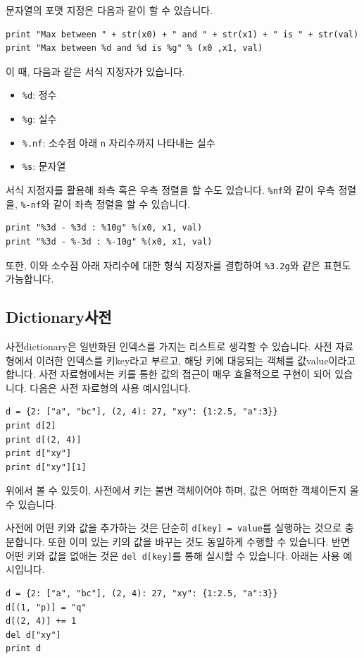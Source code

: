 \documentclass[../main.tex]{subfiles}
\begin{document}
문자열의 포맷 지정은 다음과 같이 할 수 있습니다.
\begin{verbatim}
print "Max between " + str(x0) + " and " + str(x1) + " is " + str(val)
print "Max between %d and %d is %g" % (x0 ,x1, val)
\end{verbatim}
이 때, 다음과 같은 서식 지정자가 있습니다.
\begin{itemize}
    \item \texttt{\%d}: 정수
    \item \texttt{\%g}: 실수
    \item \texttt{\%.nf}: 소수점 아래 \texttt{n} 자리수까지 나타내는 실수
    \item \texttt{\%s}: 문자열
\end{itemize}
서식 지정자를 활용해 좌측 혹은 우측 정렬을 할 수도 있습니다.
\texttt{\%nf}와 같이 우측 정렬을, \texttt{\%-nf}와 같이 좌측 정렬을 할 수 있습니다.
\begin{verbatim}
print "%3d - %3d : %10g" %(x0, x1, val)
print "%3d - %-3d : %-10g" %(x0, x1, val)
\end{verbatim}
또한, 이와 소수점 아래 자리수에 대한 형식 지정자를 결합하여 \texttt{\%3.2g}와 같은 표현도 가능합니다.

\subsection{Dictionary사전}
사전dictionary은 일반화된 인덱스를 가지는 리스트로 생각할 수 있습니다.
사전 자료형에서 이러한 인덱스를 키key라고 부르고, 해당 키에 대응되는 객체를 값value이라고 합니다.
사전 자료형에서는 키를 통한 값의 접근이 매우 효율적으로 구현이 되어 있습니다.
다음은 사전 자료형의 사용 예시입니다.
\begin{verbatim}
d = {2: ["a", "bc"], (2, 4): 27, "xy": {1:2.5, "a":3}}
print d[2]
print d[(2, 4)]
print d["xy"]
print d["xy"][1]
\end{verbatim}
위에서 볼 수 있듯이, 사전에서 키는 불변 객체이어야 하며, 값은 어떠한 객체이든지 올 수 있습니다.

사전에 어떤 키와 값을 추가하는 것은 단순히 \texttt{d[key] = value}를 실행하는 것으로 충분합니다.
또한 이미 있는 키의 값을 바꾸는 것도 동일하게 수행할 수 있습니다.
반면 어떤 키와 값을 없애는 것은 \texttt{del d[key]}를 통해 실시할 수 있습니다.
아래는 사용 예시입니다.
\begin{verbatim}
d = {2: ["a", "bc"], (2, 4): 27, "xy": {1:2.5, "a":3}}
d[(1, "p)] = "q"
d[(2, 4)] += 1
del d["xy"]
print d
\end{verbatim}
\end{document}
